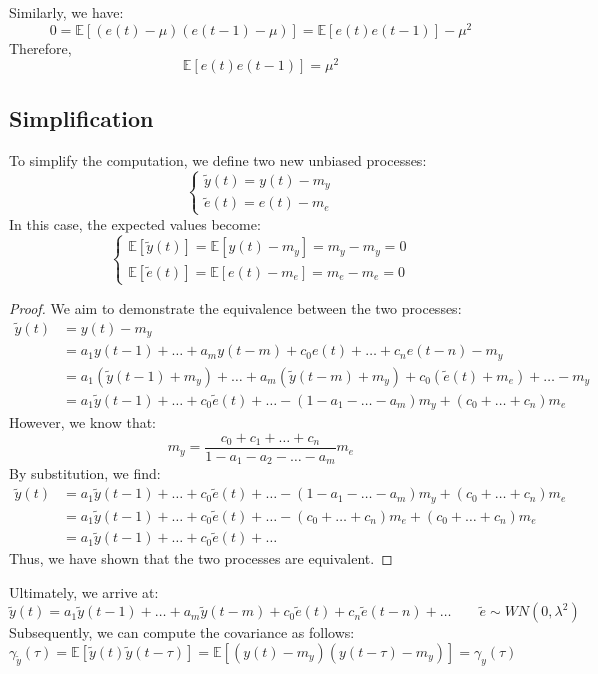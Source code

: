 Similarly, we have:
\[0=\mathbb{E}\left[\left(e(t)-\mu\right)\left(e(t-1)-\mu\right)\right] =\mathbb{E}\left[e(t)e(t-1)\right] -\mu^2\]
Therefore,
\[\mathbb{E}\left[e(t)e(t-1)\right]=\mu^2\]

\subsection{Simplification}
To simplify the computation, we define two new unbiased processes:
\[\begin{cases}
    \tilde{y}(t)=y(t)-m_y \\ 
    \tilde{e}(t)=e(t)-m_e
\end{cases}\]
In this case, the expected values become:
\[\begin{cases}
    \mathbb{E}\left[\tilde{y}(t)\right]=\mathbb{E}\left[y(t)-m_y\right]=m_y-m_y=0 \\ 
    \mathbb{E}\left[\tilde{e}(t)\right]=\mathbb{E}\left[e(t)-m_e\right]=m_e-m_e=0
\end{cases}\]

\begin{proof}
    We aim to demonstrate the equivalence between the two processes:
    \begin{align*}
        \tilde{y}(t)    &= y(t)-m_y \\
                        &= a_1y(t-1)+\dots+a_my(t-m)+c_0e(t)+\dots+c_ne(t-n) - m_y \\ 
                        &= a_1\left(\tilde{y}(t-1)+m_y\right)+\dots+a_m\left(\tilde{y}(t-m)+m_y\right)+c_0\left(\tilde{e}(t)+m_e\right)+\dots - m_y \\ 
                        &= a_1\tilde{y}(t-1) +\dots +c_0\tilde{e}(t)+\dots -\left(1 - a_1-\dots-a_m\right)m_y+\left(c_0+\dots+c_n\right)m_e   
    \end{align*}
    However, we know that:
    \[m_y =\dfrac{c_0 +c_1 +\dots+c_n}{1-a_1-a_2-\dots-a_m}m_e\]
    By substitution, we find:
    \begin{align*}
        \tilde{y}(t)    &= a_1\tilde{y}(t-1)  +\dots +c_0\tilde{e}(t)+\dots -\left(1 - a_1-\dots-a_m\right)m_y+\left(c_0+\dots+c_n\right)m_e \\ 
                        &= a_1\tilde{y}(t-1)  +\dots +c_0\tilde{e}(t)+\dots -\left(c_0 +\dots+c_n\right)m_e+\left(c_0+\dots+c_n\right)m_e \\ 
                        &= a_1\tilde{y}(t-1)  +\dots +c_0\tilde{e}(t)+\dots     
    \end{align*}
    Thus, we have shown that the two processes are equivalent.
\end{proof}
Ultimately, we arrive at:
\[ \tilde{y}(t)=a_1\tilde{y}(t-1) +\dots + a_m\tilde{y}(t-m)  +c_0\tilde{e}(t)+c_n\tilde{e}(t-n)+\dots  \qquad \tilde{e}\sim WN(0,\lambda^2)\]
Subsequently, we can compute the covariance as follows:
\[\gamma_{\tilde{y}}(\tau)=\mathbb{E}\left[ \tilde{y}(t)\tilde{y}(t-\tau) \right]=\mathbb{E}\left[ \left(y(t)-m_y\right)\left(y(t-\tau)-m_y\right) \right] =\gamma_y(\tau)\]